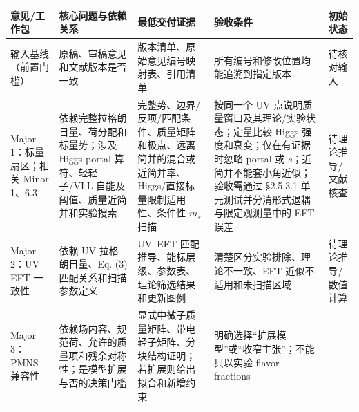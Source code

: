 \documentclass[
  chinese,
  UTF8]{ctexart}
\newcounter{none} %
\begin{document}
{\def\LTcaptype{none} %
\begin{longtable}[]{@{}
  >{\raggedright\arraybackslash}p{}
  >{\raggedright\arraybackslash}p{}
  >{\raggedright\arraybackslash}p{}
  >{\raggedright\arraybackslash}p{}
  >{\raggedright\arraybackslash}p{}@{}}
\toprule\noalign{}
\begin{minipage}[b]{\linewidth}\raggedright
意见/工作包
\end{minipage} & \begin{minipage}[b]{\linewidth}\raggedright
核心问题与依赖关系
\end{minipage} & \begin{minipage}[b]{\linewidth}\raggedright
最低交付证据
\end{minipage} & \begin{minipage}[b]{\linewidth}\raggedright
验收条件
\end{minipage} & \begin{minipage}[b]{\linewidth}\raggedright
初始状态
\end{minipage} \\
\midrule\noalign{}
\endhead
\bottomrule\noalign{}
\endlastfoot
输入基线（前置门槛） & 原稿、审稿意见和文献版本是否一致 &
版本清单、原始意见编号映射表、引用清单 &
所有编号和修改位置均能追溯到指定版本 & 待核对输入 \\
Major 1：标量扇区；相关 Minor 1、6.3 &
依赖完整拉格朗日量、荷分配和标量势；涉及 Higgs portal 算符、轻轻子/VLL
自能及阈值、质量近简并和实验搜索 &
完整势、边界/反项/匹配条件、质量矩阵和极点、远离简并的混合或近简并率、Higgs/直接标量限制适用性、条件性
\(m_s\) 扫描 & 按同一个 UV 点说明质量窗口及其理论/实验状态；定量比较
Higgs 强度和衰变；仅在有证据时忽略 portal 或
\(s\)；近简并不能套小角近似；验收需通过 §2.5.3.1
单元测试并分清形式退耦与限定观测量中的 EFT 误差 & 待理论推导/文献核查 \\
Major 2：UV--EFT 一致性 & 依赖 UV 拉格朗日量、Eq. (3)
匹配关系和扫描参数定义 & UV--EFT
匹配推导、能标层级、参数表、理论筛选结果和更新图例 &
清楚区分实验排除、理论不一致、EFT 近似不适用和未扫描区域 &
待理论推导/数值计算 \\
Major 3：PMNS 兼容性 &
依赖场内容、规范荷、允许的质量项和残余对称性；是模型扩展与否的决策门槛 &
显式中微子质量矩阵、带电轻子矩阵、分块结构证明；若扩展则给出拟合和新增约束
& 明确选择``扩展模型''或``收窄主张''；不能只以实验 flavor fractions

\end{longtable}}
\end{document}

